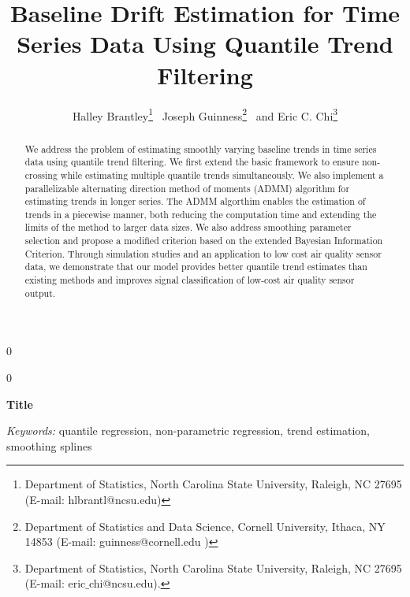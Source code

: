 \documentclass[12pt]{article}
\newcommand{\blind}{0}
\begin{document}
	
	
	\def\spacingset#1{\renewcommand{\baselinestretch}%
		{#1}\small\normalsize} \spacingset{1}
	
	
	
	\blind
	{
		\title{\bf Baseline Drift Estimation for Time Series Data Using Quantile Trend Filtering}
		\author{Halley Brantley\thanks{
				Department of Statistics, North Carolina State University, Raleigh, NC 27695 (E-mail: hlbrantl@ncsu.edu)} \,
			Joseph Guinness\thanks{
				Department of Statistics and Data Science, Cornell University, Ithaca, NY 14853 (E-mail: guinness@cornell.edu )} \,
			and
			Eric C. Chi\thanks{Department of Statistics, North Carolina State University, Raleigh, NC 27695 (E-mail: eric$\_$chi@ncsu.edu).}    \\}
		\date{}
		\maketitle
	} \fi
		
	\blind
	{
		\bigskip
		\bigskip
		\bigskip
		\begin{center}
			{\LARGE\bf Title}
		\end{center}
		\medskip
	} \fi
	
	\bigskip
	\begin{abstract}
		We address the problem of estimating smoothly varying baseline trends in time series data using quantile trend filtering. We first extend the basic framework to ensure non-crossing while estimating multiple quantile trends simultaneously. We also implement a parallelizable alternating direction method of moments (ADMM) algorithm for estimating trends in longer series. The ADMM algorthim enables the estimation of trends in a piecewise manner, both reducing the computation time and extending the limits of the method to larger data sizes. We also address smoothing parameter selection and propose a modified criterion based on the extended Bayesian Information Criterion. Through simulation studies and an application to low cost air quality sensor data, we demonstrate that our model provides better quantile trend estimates than existing methods and improves signal classification of low-cost air quality sensor output. 
	\end{abstract}
	
	\noindent%
	{\it Keywords:} quantile regression, non-parametric regression, trend estimation, smoothing splines
	\vfill
	
\end{document}
